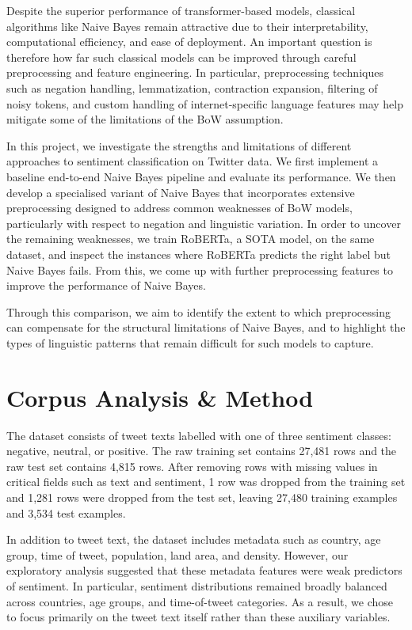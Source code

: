 \documentclass[11pt]{article}
\begin{document}
Despite the superior performance of transformer-based models, classical algorithms like Naive Bayes remain attractive due to their interpretability, computational efficiency, and ease of deployment. An important question is therefore how far such classical models can be improved through careful preprocessing and feature engineering. In particular, preprocessing techniques such as negation handling, lemmatization, contraction expansion, filtering of noisy tokens, and custom handling of internet-specific language features may help mitigate some of the limitations of the BoW assumption.

In this project, we investigate the strengths and limitations of different approaches to sentiment classification on Twitter data. We first implement a baseline end-to-end Naive Bayes pipeline and evaluate its performance. We then develop a specialised variant of Naive Bayes that incorporates extensive preprocessing designed to address common weaknesses of BoW models, particularly with respect to negation and linguistic variation. In order to uncover the remaining weaknesses, we train RoBERTa, a SOTA model, on the same dataset, and inspect the instances where RoBERTa predicts the right label but Naive Bayes fails. From this, we come up with further preprocessing features to improve the performance of Naive Bayes. 

Through this comparison, we aim to identify the extent to which preprocessing can compensate for the structural limitations of Naive Bayes, and to highlight the types of linguistic patterns that remain difficult for such models to capture.


\section{Corpus Analysis \& Method}

The dataset consists of tweet texts labelled with one of three sentiment classes: negative, neutral, or positive. The raw training set contains 27,481 rows and the raw test set contains 4,815 rows. After removing rows with missing values in critical fields such as text and sentiment, 1 row was dropped from the training set and 1,281 rows were dropped from the test set, leaving 27,480 training examples and 3,534 test examples.

In addition to tweet text, the dataset includes metadata such as country, age group, time of tweet, population, land area, and density. However, our exploratory analysis suggested that these metadata features were weak predictors of sentiment. In particular, sentiment distributions remained broadly balanced across countries, age groups, and time-of-tweet categories. As a result, we chose to focus primarily on the tweet text itself rather than these auxiliary variables.
\end{document}
